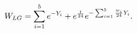 \begin{equation}
\label{eq:WLG2}
W_{LG}=\sum_{i=1}^5e^{-Y_i}+e^{{t\over24}}e^{-\sum_{i=1}^5{w_i\over24}Y_i}.
\end{equation}


